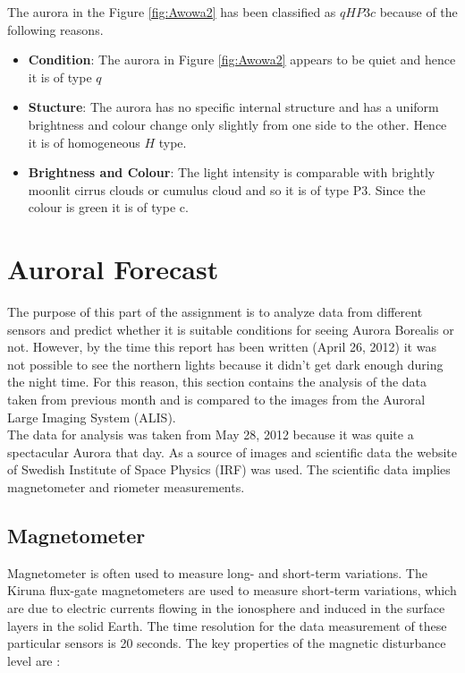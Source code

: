 \documentclass{article}
\begin{document}
The aurora in the Figure \ref{fig:Awowa2} has been classified as $qHP3c$ because of the following reasons.

\begin{itemize}
\item \textbf{Condition}:  The aurora in Figure \ref{fig:Awowa2} appears to be quiet and hence it is of type $ q $ 
\item \textbf{Stucture}: The aurora has no specific internal structure and has a uniform brightness and colour change only slightly from one side to the other. Hence it is of homogeneous $ H $ type. 
\item \textbf{Brightness and Colour}: The light intensity is comparable with brightly moonlit cirrus clouds or cumulus cloud and so it is of type P3. Since the colour is green it is of type c.
\end{itemize}


\section{Auroral Forecast}

The purpose of this part of the assignment is to analyze data from different sensors and predict whether it is suitable conditions for seeing Aurora Borealis or not. However, by the time this report has been written (April 26, 2012) it was not possible to see the northern lights because it didn't get dark enough during the night time. For this reason, this section contains the analysis of the data taken from previous month and is compared to the images from the Auroral Large Imaging System (ALIS).
\\
The data for analysis was taken from May 28, 2012 because it was quite a spectacular Aurora that day. As a source of images and scientific data the website of Swedish Institute of Space Physics (IRF) was used. The scientific data implies magnetometer and riometer measurements.

\subsection{Magnetometer}
Magnetometer is often used to measure long- and short-term variations. The Kiruna flux-gate magnetometers are used to measure short-term variations, which are due to electric currents flowing in the ionosphere and induced in the surface layers in the solid Earth. The time resolution for the data measurement of these particular sensors is 20 seconds. The key properties of the magnetic disturbance level are \cite{KivelsonRussell:1996isp}:
\end{document}
